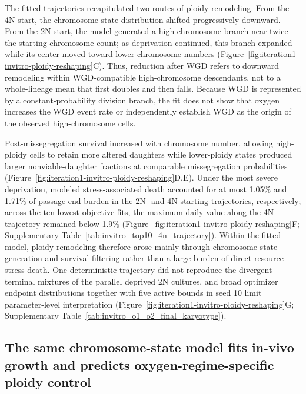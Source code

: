 \documentclass[11pt]{article}
\begin{document}
The fitted trajectories recapitulated two routes of ploidy remodeling. From the 4N start, the chromosome-state distribution shifted progressively downward. From the 2N start, the model generated a high-chromosome branch near twice the starting chromosome count; as deprivation continued, this branch expanded while its center moved toward lower chromosome numbers (Figure~\ref{fig:iteration1-invitro-ploidy-reshaping}C). Thus, reduction after WGD refers to downward remodeling within WGD-compatible high-chromosome descendants, not to a whole-lineage mean that first doubles and then falls. Because WGD is represented by a constant-probability division branch, the fit does not show that oxygen increases the WGD event rate or independently establish WGD as the origin of the observed high-chromosome cells.

Post-missegregation survival increased with chromosome number, allowing high-ploidy cells to retain more altered daughters while lower-ploidy states produced larger nonviable-daughter fractions at comparable missegregation probabilities (Figure~\ref{fig:iteration1-invitro-ploidy-reshaping}D,E). Under the most severe deprivation, modeled stress-associated death accounted for at most 1.05\% and 1.71\% of passage-end burden in the 2N- and 4N-starting trajectories, respectively; across the ten lowest-objective fits, the maximum daily value along the 4N trajectory remained below 1.9\% (Figure~\ref{fig:iteration1-invitro-ploidy-reshaping}F; Supplementary Table~\ref{tab:invitro_top10_4n_trajectory}). Within the fitted model, ploidy remodeling therefore arose mainly through chromosome-state generation and survival filtering rather than a large burden of direct resource-stress death. One deterministic trajectory did not reproduce the divergent terminal mixtures of the parallel deprived 2N cultures, and broad optimizer endpoint distributions together with five active bounds in seed 10 limit parameter-level interpretation (Figure~\ref{fig:iteration1-invitro-ploidy-reshaping}G; Supplementary Table~\ref{tab:invitro_o1_o2_final_karyotype}).

\subsection*{The same chromosome-state model fits in-vivo growth and predicts oxygen-regime-specific ploidy control}
\end{document}
